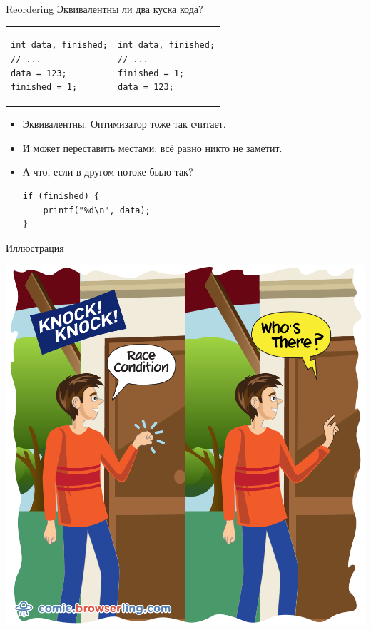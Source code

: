 \begin{frame}[fragile]{Reordering}
	Эквивалентны ли два куска кода?
	\begin{tabular}{p{}p{}}
		\centering
\begin{verbatim}
int data, finished;
// ...
data = 123;
finished = 1;
\end{verbatim}
&
\begin{verbatim}
int data, finished;
// ...
finished = 1;
data = 123;
\end{verbatim}
	\end{tabular}
	\pause
	\begin{itemize}
		\item Эквивалентны. Оптимизатор тоже так считает.
		\pause\item И может переставить местами: всё равно никто не заметит.
		\pause\item А что, если в другом потоке было так?
\begin{verbatim}
if (finished) {
    printf("%d\n", data);
}
\end{verbatim}
	\end{itemize}
\end{frame}

\begin{frame}{Иллюстрация}
	\begin{center}
		\includegraphics[scale=0.2]{race-condition-knock-knock.jpg}
	\end{center}
\end{frame}

